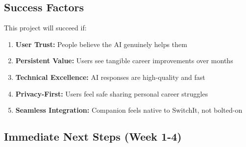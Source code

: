 \documentclass[12pt,a4paper]{article}
\begin{document}
\subsection{Success Factors}

This project will succeed if:

\begin{enumerate}[leftmargin=*]
    \item \textbf{User Trust:} People believe the AI genuinely helps them
    \item \textbf{Persistent Value:} Users see tangible career improvements over months
    \item \textbf{Technical Excellence:} AI responses are high-quality and fast
    \item \textbf{Privacy-First:} Users feel safe sharing personal career struggles
    \item \textbf{Seamless Integration:} Companion feels native to SwitchIt, not bolted-on
\end{enumerate}

\subsection{Immediate Next Steps (Week 1-4)}
\end{document}
